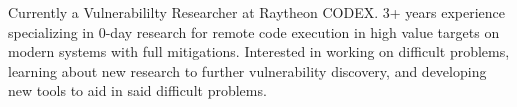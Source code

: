 

\begin{cvparagraph}

Currently a Vulnerabililty Researcher at Raytheon CODEX. 3+ years experience specializing in 0-day research for 
remote code execution in high value targets on modern systems with full mitigations. Interested in working on 
difficult problems, learning about new research to further vulnerability discovery, and developing
new tools to aid in said difficult problems.
\end{cvparagraph}
